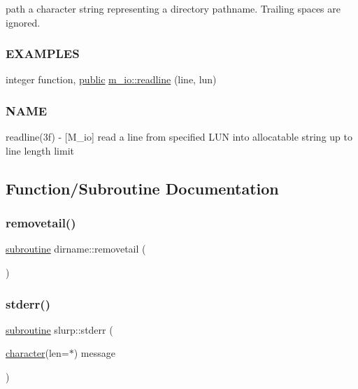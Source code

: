 \begin{DoxyCompactItemize}
\begin{DoxyCompactList}
path a character string representing a directory pathname. Trailing spaces are ignored. \subsubsection*{E\+X\+A\+M\+P\+L\+ES}\end{DoxyCompactList}\item 
integer function, \hyperlink{M__stopwatch_83_8txt_a2f74811300c361e53b430611a7d1769f}{public} \hyperlink{namespacem__io_a8d9ee59e21830662fa59c300ca23e04b}{m\+\_\+io\+::readline} (line, lun)
\begin{DoxyCompactList}\small\item\em \subsubsection*{N\+A\+ME}

readline(3f) -\/ \mbox{[}M\+\_\+io\mbox{]} read a line from specified L\+UN into allocatable string up to line length limit \end{DoxyCompactList}\end{DoxyCompactItemize}


\subsection{Function/\+Subroutine Documentation}
\mbox{\label{M__io_8f90_af19c15eaa4f2a0ca08d241277ce7c256}} 
\subsubsection{\texorpdfstring{removetail()}{removetail()}}
{\footnotesize\ttfamily \hyperlink{M__stopwatch_83_8txt_acfbcff50169d691ff02d4a123ed70482}{subroutine} dirname\+::removetail (\begin{DoxyParamCaption}{ }\end{DoxyParamCaption})\hspace{0.3cm}{\ttfamily [private]}}

\mbox{\label{M__io_8f90_a448cccd08d4d6bce645ffbbf14cdfa7e}} 
\subsubsection{\texorpdfstring{stderr()}{stderr()}}
{\footnotesize\ttfamily \hyperlink{M__stopwatch_83_8txt_acfbcff50169d691ff02d4a123ed70482}{subroutine} slurp\+::stderr (\begin{DoxyParamCaption}\item[{\hyperlink{option__stopwatch_83_8txt_abd4b21fbbd175834027b5224bfe97e66}{character}(len=$\ast$)}]{message }\end{DoxyParamCaption})\hspace{0.3cm}{\ttfamily [private]}}

